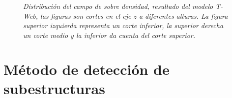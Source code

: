 \begin{figure} 
\centering 
{} 
\caption{\emph{Distribución del campo de sobre densidad, resultado del modelo T-Web, las figuras son cortes en el eje $z$ a diferentes alturas. La figura superior izquierda representa un corte inferior, la superior derecha un corte medio  y la inferior da cuenta del corte superior.}} 
\label{fig: Campo de densidad } 
\end{figure}




\section{Método de detección de subestructuras}
\label{sec: detección sub-estructuras}

